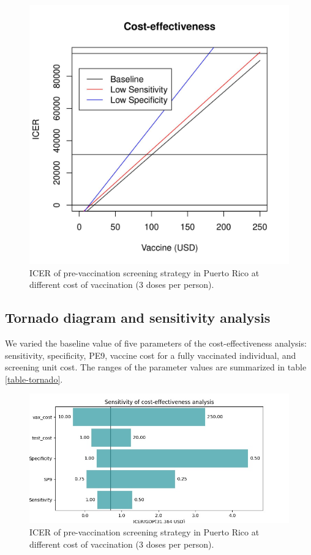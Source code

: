 \documentclass[12pt]{article}
\begin{document}
\begin{figure}[H]
  \centering
  \includegraphics[width=.7\linewidth]{../analysis/figures/report_figure_ICER.jpeg}
  \caption{ICER of pre-vaccination screening strategy in Puerto Rico at different cost of vaccination (3 doses per person).}
  \label{fig-ICER}
\end{figure}

\subsection{Tornado diagram and sensitivity analysis}
We varied the baseline value of five parameters of the cost-effectiveness analysis: sensitivity, specificity, PE9, vaccine cost for a fully vaccinated individual, and screening unit cost. The ranges of the parameter values are summarized in table \ref{table-tornado}.

\begin{figure}[H]
  \centering \includegraphics[width=.8\linewidth]{../analysis/figures/report_figure_tornado_diagram.jpeg}
  \caption{ICER of pre-vaccination screening strategy in Puerto Rico at different cost of vaccination (3 doses per person).}
  \label{fig-tornado}
\end{figure}
\end{document}
